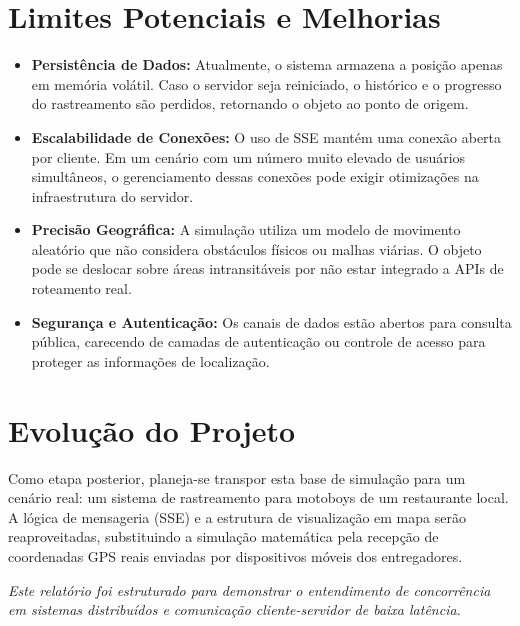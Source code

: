 \documentclass[12pt,a4paper]{article}
\begin{document}
\section{Limites Potenciais e Melhorias}

\begin{itemize}
    \item \textbf{Persistência de Dados:} Atualmente, o sistema armazena a posição apenas em memória volátil. Caso o servidor seja reiniciado, o histórico e o progresso do rastreamento são perdidos, retornando o objeto ao ponto de origem.
    
    \item \textbf{Escalabilidade de Conexões:} O uso de SSE mantém uma conexão aberta por cliente. Em um cenário com um número muito elevado de usuários simultâneos, o gerenciamento dessas conexões pode exigir otimizações na infraestrutura do servidor.
    
    \item \textbf{Precisão Geográfica:} A simulação utiliza um modelo de movimento aleatório que não considera obstáculos físicos ou malhas viárias. O objeto pode se deslocar sobre áreas intransitáveis por não estar integrado a APIs de roteamento real.
    
    \item \textbf{Segurança e Autenticação:} Os canais de dados estão abertos para consulta pública, carecendo de camadas de autenticação ou controle de acesso para proteger as informações de localização.
\end{itemize}

\section{Evolução do Projeto}
Como etapa posterior, planeja-se transpor esta base de simulação para um cenário real: um sistema de rastreamento para motoboys de um restaurante local. A lógica de mensageria (SSE) e a estrutura de visualização em mapa serão reaproveitadas, substituindo a simulação matemática pela recepção de coordenadas GPS reais enviadas por dispositivos móveis dos entregadores.

\vfill
\begin{center}
    \textit{Este relatório foi estruturado para demonstrar o entendimento de concorrência em sistemas distribuídos e comunicação cliente-servidor de baixa latência.}
\end{center}
\end{document}

